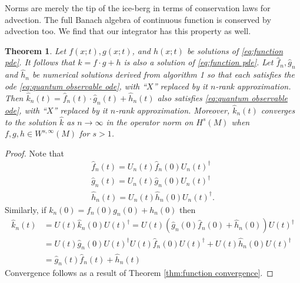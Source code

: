 \documentclass[final,leqno]{siamltex1213}
\newtheorem{thm}{Theorem}[section]
\begin{document}
Norms are merely the tip of the ice-berg in terms of conservation laws for advection.
The full Banach algebra of continuous function is conserved by advection too.
We find that our integrator has this property as well.
\begin{thm} \label{thm:algebra}
	Let $f(x;t),g(x;t)$, and $h(x;t)$ be solutions of \eqref{eq:function pde}.
	It follows that $k= f \cdot g + h $ is also a solution of \eqref{eq:function pde}.
	Let $\hat{f}_{n}, \hat{g}_{n}$ and $\hat{h}_{n}$ be numerical solutions derived from algorithm 1
	so that each satisfies the ode \eqref{eq:quantum observable ode}, with ``$X$'' replaced by it $n$-rank approximation.
	Then $\hat{k}_{n}(t) = \hat{f}_{n}(t) \cdot \hat{g}_{n}(t) + \hat{h}_{n}(t)$ also satisfies \eqref{eq:quantum observable ode}, with ``$X$'' replaced by it $n$-rank approximation.
	Moreover, $\hat{k}_{n}(t)$ converges to the solution $\hat{k}$ as $n \to \infty$ in the operator norm on $H^{s}(M)$ when $f,g,h \in W^{s,\infty}(M)$ for $s>1$.
\end{thm}
\begin{proof}
	Note that 
	\begin{align}
		\hat{f}_{n}(t) = U_{n}(t) \hat{f}_{n}(0) U_{n}(t)^{\dagger} \\
		\hat{g}_{n}(t) = U_{n}(t) \hat{g}_{n}(0) U_{n}(t)^{\dagger} \\
		\hat{h}_{n}(t) = U_{n}(t) \hat{h}_{n}(0) U_{n}(t)^{\dagger}.
	\end{align}
	Similarly, if $k_{n}(0) = f_{n}(0) g_{n}(0) + h_{n}(0)$ then
	\begin{align}
		\hat{k}_{n}(t) &= U(t) \hat{k}_{n}(0) U(t)^{\dagger} = U(t)\left( \hat{g}_{n}(0) \hat{f}_{n}(0) + \hat{h}_{n}(0) \right) U(t)^{\dagger} \\
			&= U(t) \hat{g}_{n}(0) U(t)^{\dagger} U(t) \hat{f}_{n}(0) U(t)^{\dagger} + U(t) \hat{h}_{n}(0) U(t)^{\dagger} \\
			&= \hat{g}_{n}(t) \hat{f}_{n}(t) + \hat{h}_{n}(t)
	\end{align}
	Convergence follows as a result of Theorem \ref{thm:function convergence}.
\end{proof}
\end{document}
